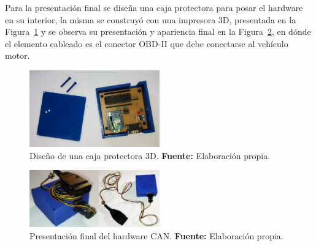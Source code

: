 Para la presentación final se diseña una caja protectora para posar el hardware en su interior, la misma se construyó con una impresora 3D, presentada en la Figura~\ref{3d}  y se observa su presentación y apariencia final en la Figura~\ref{final}, en dónde el elemento cableado es el conector OBD-II que debe conectarse al vehículo motor. 

\begin{figure}[H]
	\centering
	\includegraphics[width=0.5\textwidth]{./Cap4imagen/circuitoycaja_fig.jpeg}
	\caption[Diseño de una caja protectora 3D.]{Diseño de una caja protectora 3D. \textbf{ Fuente:} Elaboración propia.}
	\label{3d} %
\end{figure}


\begin{figure}[H]
	\centering
	\includegraphics[width=0.5\textwidth]{./Cap4imagen/disenofinal_fig.jpg}
	\caption[Presentación final del hardware CAN.]{Presentación final del hardware CAN. \textbf{ Fuente:} Elaboración propia.}
	\label{final} %
\end{figure}






